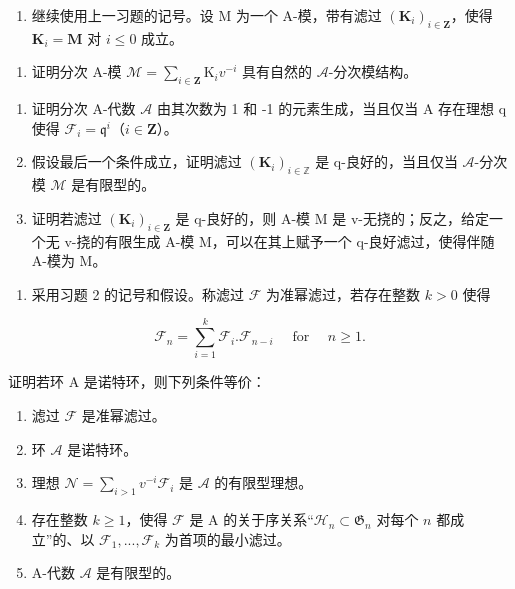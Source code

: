 \begin{enumerate}
\def\labelenumi{\arabic{enumi})}
\setcounter{enumi}{2}
\tightlist
\item
  继续使用上一习题的记号。设 M 为一个 A-模，带有滤过 \((\mathbf{K}_i)_{i\in\mathbf{Z}}\)，使得 \(\mathbf{K}_i = \mathbf{M}\) 对 \(i \leqslant 0\) 成立。
\end{enumerate}

\begin{enumerate}
\def\labelenumi{\alph{enumi})}
\tightlist
\item
  证明分次 A-模 \(\mathcal{M} = \sum_{i\in \mathbf{Z}}\mathrm{K}_{i}v^{-i}\) 具有自然的 \(\mathcal{A}\)-分次模结构。
\end{enumerate}



\begin{enumerate}
\def\labelenumi{\alph{enumi})}
\setcounter{enumi}{1}
\item
  证明分次 A-代数 \(\mathcal{A}\) 由其次数为 1 和 -1 的元素生成，当且仅当 A 存在理想 q 使得 \(\mathcal{F}_i = \mathfrak{q}^i\)（\(i \in \mathbf{Z}\)）。
\item
  假设最后一个条件成立，证明滤过 \((\mathbf{K}_i)_{i\in \mathbb{Z}}\) 是 q-良好的，当且仅当 \(\mathcal{A}\)-分次模 \(\mathcal{M}\) 是有限型的。
\item
  证明若滤过 \((\mathbf{K}_{i})_{i\in\mathbf{Z}}\) 是 q-良好的，则 A-模 M 是 v-无挠的；反之，给定一个无 v-挠的有限生成 A-模 M，可以在其上赋予一个 q-良好滤过，使得伴随 A-模为 M。
\end{enumerate}

\begin{enumerate}
\def\labelenumi{\arabic{enumi})}
\setcounter{enumi}{3}
\tightlist
\item
  采用习题 2 的记号和假设。称滤过 \(\mathcal{F}\) 为准幂滤过，若存在整数 \(k > 0\) 使得
\end{enumerate}

\[
\mathcal {F} _ {n} = \sum_ {i = 1} ^ {k} \mathcal {F} _ {i}. \mathcal {F} _ {n - i} \quad \text { for } \quad n \geqslant 1.
\]

证明若环 A 是诺特环，则下列条件等价：

\begin{enumerate}
\def\labelenumi{(\roman{enumi})}
\item
  滤过 \(\mathcal{F}\) 是准幂滤过。
\item
  环 \(\mathcal{A}\) 是诺特环。
\item
  理想 \(\mathcal{N} = \sum_{i > 1} v^{-i}\mathcal{F}_i\) 是 \(\mathcal{A}\) 的有限型理想。
\item
  存在整数 \(k \geqslant 1\)，使得 \(\mathcal{F}\) 是 A 的关于序关系“\(\mathcal{H}_n \subset \mathfrak{G}_n\) 对每个 \(n\) 都成立”的、以 \(\mathcal{F}_1, ..., \mathcal{F}_k\) 为首项的最小滤过。
\item
  A-代数 \(\mathcal{A}\) 是有限型的。
\end{enumerate}

